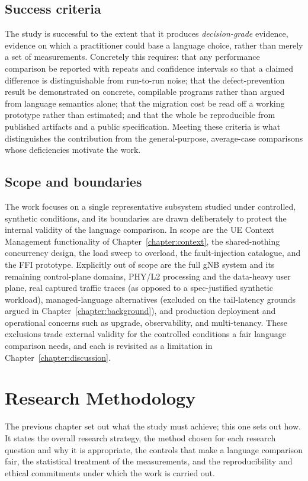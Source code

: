 \documentclass[english,twoside,openright,a4paper,censored,csm,software-track-2020]{HYthesisML}
\begin{document}
\section{Success criteria}
The study is successful to the extent that it produces \emph{decision-grade} evidence, evidence
on which a practitioner could base a language choice, rather than merely a set of measurements.
Concretely this requires: that any performance comparison be reported with repeats and
confidence intervals so that a claimed difference is distinguishable from run-to-run noise; that
the defect-prevention result be demonstrated on concrete, compilable programs rather than argued
from language semantics alone; that the migration cost be read off a working prototype rather
than estimated; and that the whole be reproducible from published artifacts and a public
specification. Meeting these criteria is what distinguishes the contribution from the
general-purpose, average-case comparisons whose deficiencies motivate the work.

\section{Scope and boundaries}
The work focuses on a single representative subsystem studied under controlled, synthetic
conditions, and its boundaries are drawn deliberately to protect the internal validity of the
language comparison. In scope are the UE Context Management functionality of
Chapter~\ref{chapter:context}, the shared-nothing concurrency design, the load sweep to
overload, the fault-injection catalogue, and the FFI prototype. Explicitly out of scope are the
full gNB system and its remaining control-plane domains, PHY/L2 processing and the data-heavy
user plane, real captured traffic traces (as opposed to a spec-justified synthetic workload),
managed-language alternatives (excluded on the tail-latency grounds argued in
Chapter~\ref{chapter:background}), and production deployment and operational concerns such as
upgrade, observability, and multi-tenancy. These exclusions trade external validity for the
controlled conditions a fair language comparison needs, and each is revisited as a limitation in
Chapter~\ref{chapter:discussion}.

\chapter{Research Methodology\label{chapter:methodology}}

The previous chapter set out what the study must achieve; this one sets out how. It states
the overall research strategy, the method chosen for each research question and why it is
appropriate, the controls that make a language comparison fair, the statistical treatment of
the measurements, and the reproducibility and ethical commitments under which the work is
carried out.
\end{document}
